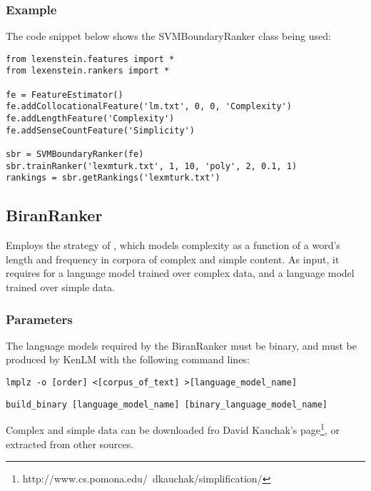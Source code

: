\subsubsection{Example}

The code snippet below shows the SVMBoundaryRanker class being used:

\begin{lstlisting}
from lexenstein.features import *
from lexenstein.rankers import *

fe = FeatureEstimator()
fe.addCollocationalFeature('lm.txt', 0, 0, 'Complexity')
fe.addLengthFeature('Complexity')
fe.addSenseCountFeature('Simplicity')

sbr = SVMBoundaryRanker(fe)
sbr.trainRanker('lexmturk.txt', 1, 10, 'poly', 2, 0.1, 1)
rankings = sbr.getRankings('lexmturk.txt')
\end{lstlisting}











\subsection{BiranRanker}

Employs the strategy of \cite{Biran2011}, which models complexity as a function of a word's length and frequency in corpora of complex and simple content. As input, it requires for a language model trained over complex data, and a language model trained over simple data.

\subsubsection{Parameters}

The language models required by the BiranRanker must be binary, and must be produced by KenLM with the following command lines:

\begin{lstlisting}
lmplz -o [order] <[corpus_of_text] >[language_model_name]
\end{lstlisting}
\begin{lstlisting}
build_binary [language_model_name] [binary_language_model_name]
\end{lstlisting}

Complex and simple data can be downloaded fro David Kauchak's page\footnote{http://www.cs.pomona.edu/~dkauchak/simplification/}, or extracted from other sources.

